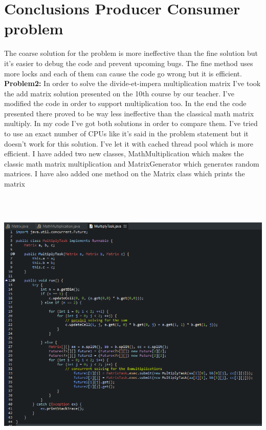 \documentclass[14pt]{article}
\begin{document}
\section*{Conclusions Producer Consumer problem}
\vspace{10 mm}
The coarse solution for the problem is more ineffective than the fine solution but it's easier to debug the code and prevent upcoming bugs. The fine method uses more locks and each of them can cause the code go wrong but it is efficient.\\
\newpage
\textbf{Problem2:} In order to solve the divide-et-impera multiplication matrix I've took the add matrix solution presented on the 10th course by our teacher. I've modified the code in order to support multiplication too. In the end the code presented there proved to be way less ineffective than the classical math matrix multiply. In my code I've got both solutions in order to compare them. I've tried to use an exact number of CPUs like it's said in the problem statement but it doesn't work for this solution. I've let it with cached thread pool which is more efficient. I have added two new classes, MathMultiplication which makes the classic math matrix multiplication and MatrixGenerator which generates random matrices. I have also added one method on the Matrix class which prints the matrix\\
\includegraphics[height=5.5in, width = 5.5in]{matrix1.png}\\
\end{document}
